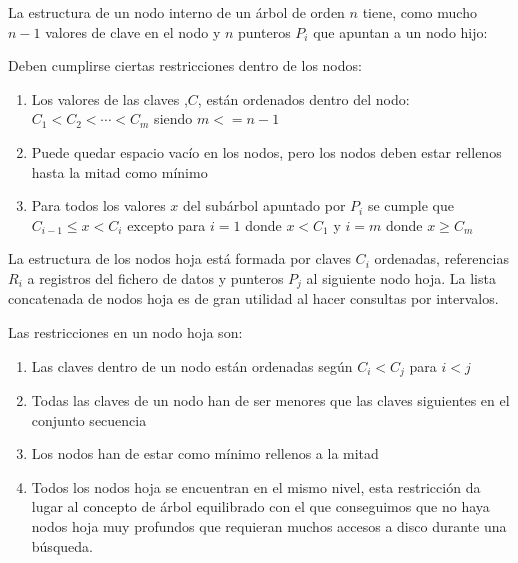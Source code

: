 \documentclass[10pt,a4paper,spanish]{report}
\begin{document}
La estructura de un nodo interno de un árbol de orden $n$ tiene, como mucho $n-1$ valores de clave en el nodo y $n$ punteros $P_i$ que apuntan a un nodo hijo:



Deben cumplirse ciertas restricciones dentro de los nodos:
\begin{enumerate}[$\heartsuit$]
    \item Los valores de las claves ,$C$, están ordenados dentro del nodo: $C_1 < C_2 < \cdots < C_m$ siendo $m <= n-1$
    \item Puede quedar espacio vacío en los nodos, pero los nodos deben estar rellenos hasta la mitad como mínimo
    \item Para todos los valores $x$ del subárbol apuntado por $P_i$ se cumple que $C_{i-1} \leq x < C_i$ excepto para $i=1$ donde $x < C_1$ y $i=m$ donde $x \geq C_m$
\end{enumerate}

La estructura de los nodos hoja está formada por claves $C_i$ ordenadas, referencias $R_i$ a registros del fichero de datos y punteros $P_j$ al siguiente nodo hoja. La lista concatenada de nodos hoja es de gran utilidad al hacer consultas por intervalos.



Las restricciones en un nodo hoja son:
\begin{enumerate}[$\heartsuit$]
    \item Las claves dentro de un nodo están ordenadas según $C_i < C_j$ para $i < j$
    \item Todas las claves de un nodo han de ser menores que las claves siguientes en el conjunto secuencia
    \item Los nodos han de estar como mínimo rellenos a la mitad
    \item Todos los nodos hoja se encuentran en el mismo nivel, esta restricción da lugar al concepto de árbol equilibrado con el que conseguimos que no haya nodos hoja muy profundos que requieran muchos accesos a disco durante una búsqueda.
\end{enumerate}
\end{document}

